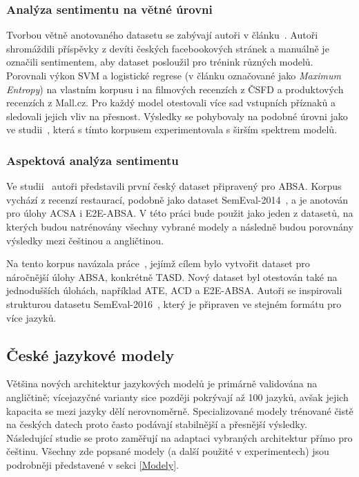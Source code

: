 \subsubsection{Analýza sentimentu na větné úrovni}
Tvorbou větně anotovaného datasetu se zabývají autoři v článku~\cite{habernal-etal-2013-sentiment}. Autoři shromáždili příspěvky z devíti českých facebookových stránek a manuálně je označili sentimentem, aby dataset posloužil pro trénink různých modelů. Porovnali výkon SVM a logistické regrese (v článku označované jako \emph{Maximum Entropy}) na vlastním korpusu i na filmových recenzích z ČSFD a produktových recenzích z Mall.cz. Pro každý model otestovali více sad vstupních příznaků a sledovali jejich vliv na přesnost. Výsledky se pohybovaly na podobné úrovni jako ve studii~\cite{_ano_2019}, která s tímto korpusem experimentovala s širším spektrem modelů.

\subsubsection{Aspektová analýza sentimentu}
Ve studii~\cite{steinberger-etal-2014-aspect} autoři představili první český dataset připravený pro ABSA. Korpus vychází z recenzí restaurací, podobně jako dataset SemEval-2014~\cite{pontiki-etal-2014-semeval}, a je anotován pro úlohy ACSA i E2E-ABSA. V této práci bude použit jako jeden z datasetů, na kterých budou natrénovány všechny vybrané modely a následně budou porovnány výsledky mezi češtinou a angličtinou.

Na tento korpus navázala práce~\cite{smid-etal-2024-czech}, jejímž cílem bylo vytvořit dataset pro náročnější úlohy ABSA, konkrétně TASD. Nový dataset byl otestován také na jednodušších úlohách, například ATE, ACD a E2E-ABSA. Autoři se inspirovali strukturou datasetu SemEval-2016~\cite{pontiki-etal-2016-semeval}, který je připraven ve stejném formátu pro více jazyků.

\subsection{České jazykové modely}
Většina nových architektur jazykových modelů je primárně validována na angličtině; vícejazyčné varianty sice později pokrývají až 100 jazyků, avšak jejich kapacita se mezi jazyky dělí nerovnoměrně. Specializované modely trénované čistě na českých datech proto často podávají stabilnější a přesnější výsledky. Následující studie se proto zaměřují na adaptaci vybraných architektur přímo pro češtinu. Všechny zde popsané modely (a další použité v experimentech) jsou podrobněji představené v sekci \ref{Modely}.

